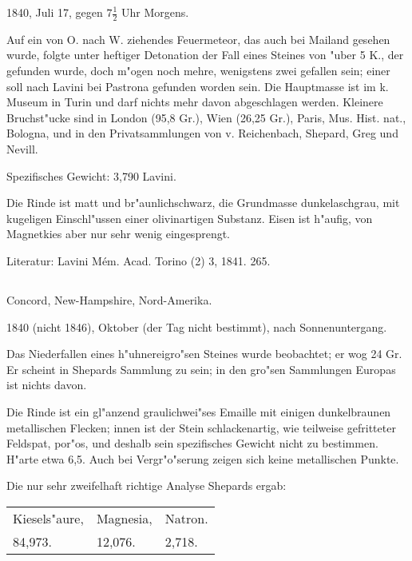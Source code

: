 \documentclass[a4paper, 11pt, oneside]{article}
\begin{document}
1840, Juli 17, gegen $\mathfrak{7\frac{1}{2}}$ Uhr Morgens.

Auf ein von O. nach W. ziehendes Feuermeteor, das auch bei Mailand gesehen wurde, folgte unter heftiger Detonation der Fall eines Steines von "uber 5 K., der gefunden wurde, doch m"ogen noch mehre, wenigstens zwei gefallen sein; einer soll nach Lavini bei Pastrona gefunden worden sein. Die Hauptmasse ist im k. Museum in Turin und darf nichts mehr davon abgeschlagen werden. Kleinere Bruchst"ucke sind in London (95,8 Gr.), Wien (26,25 Gr.), Paris, Mus. Hist. nat., Bologna, und in den Privatsammlungen von v. Reichenbach, Shepard, Greg und Nevill.

Spezifisches Gewicht: 3,790 Lavini.

Die Rinde ist matt und br"aunlichschwarz, die Grundmasse dunkelaschgrau, mit kugeligen Einschl"ussen einer olivinartigen Substanz. Eisen ist h"aufig, von Magnetkies aber nur sehr wenig eingesprengt.

\normalsize
Literatur: Lavini Mém. Acad. Torino (2) 3, 1841. 265.

\subsection{}
\LARGE
\paragraph{}
Concord, New-Hampshire, Nord-Amerika.

1840 (nicht 1846), Oktober (der Tag nicht bestimmt), nach Sonnenuntergang.

Das Niederfallen eines h"uhnereigro"sen Steines wurde beobachtet; er wog 24 Gr. Er scheint in Shepards Sammlung zu sein; in den gro"sen Sammlungen Europas ist nichts davon.

Die Rinde ist ein gl"anzend graulichwei"ses Emaille mit einigen dunkelbraunen metallischen Flecken; innen ist der Stein schlackenartig, wie teilweise gefritteter Feldspat, por"os, und deshalb sein spezifisches Gewicht nicht zu bestimmen. H"arte etwa 6,5. Auch bei Vergr"o"serung zeigen sich keine metallischen Punkte.

Die nur sehr zweifelhaft richtige Analyse Shepards ergab:
\begin{table}[!ht]
    \centering\swabfamily\Large
    \begin{tabular}{l l l}
        Kiesels"aure, & Magnesia, & Natron. \\
        84,973. & 12,076. & 2,718. \\
    \end{tabular}
\end{table}
\end{document}
